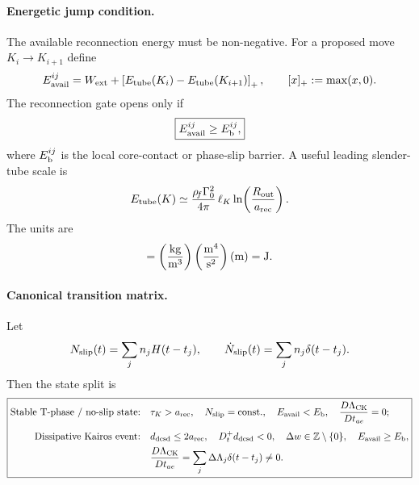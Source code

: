 \paragraph{Energetic jump condition.}
The available reconnection energy must be non-negative. For a proposed move $K_i\to K_{i+1}$ define
\begin{equation}
    E_{\rm avail}^{ij}
    =
    W_{\rm ext}
    +
    \left[ E_{\rm tube}(K_i)-E_{\rm tube}(K_{i+1})\right]_+,
    \qquad
    [x]_+:=\max(x,0).
    \label{eq:sst_positive_part_available_energy}
\end{equation}
The reconnection gate opens only if
\begin{equation}
    \boxed{
    E_{\rm avail}^{ij}\ge E_{\rm b}^{ij},
    }
    \label{eq:sst_reconnection_energy_gate}
\end{equation}
where $E_{\rm b}^{ij}$ is the local core-contact or phase-slip barrier. A useful leading slender-tube scale is
\begin{equation}
    E_{\rm tube}(K)
    \simeq
    \frac{\rho_{\!f}\Gamma_0^2}{4\pi}\,
    \ell_K
    \ln\!\left(\frac{R_{\rm out}}{a_{\rm rec}}\right).
    \label{eq:sst_slender_tube_energy_hitting}
\end{equation}
The units are
\begin{equation}
    [\rhoF\Gamma_0^2\ell_K]
    =
    \left(\frac{\rm kg}{{\rm m}^3}\right)
    \left(\frac{{\rm m}^4}{{\rm s}^2}\right)
    ({\rm m})
    =
    {\rm J}.
    \label{eq:sst_hitting_energy_units}
\end{equation}

\paragraph{Canonical transition matrix.}
Let
\begin{equation}
    N_{\rm slip}(t)
    =
    \sum_j n_jH(t-t_j),
    \qquad
    \dot N_{\rm slip}(t)
    =
    \sum_j n_j\delta(t-t_j).
    \label{eq:sst_phase_slip_counter}
\end{equation}
Then the state split is
\begin{equation}
\boxed{
\begin{aligned}
\text{Stable T-phase / no-slip state:}\quad
& \tau_K>a_{\rm rec},
\quad N_{\rm slip}={\rm const.},
\quad E_{\rm avail}<E_{\rm b},
\quad \frac{D\Lambda_{\rm CK}}{Dt_{ae}}=0;\\[0.4em]
\text{Dissipative Kairos event:}\quad
& d_{\rm dcsd}\le2a_{\rm rec},
\quad D_t^+d_{\rm dcsd}<0,
\quad \Delta w\in\mathbb Z\setminus\{0\},
\quad E_{\rm avail}\ge E_{\rm b},\\
& \frac{D\Lambda_{\rm CK}}{Dt_{ae}}
=\sum_j\Delta\Lambda_j\delta(t-t_j)\ne0.
\end{aligned}}
\label{eq:sst_canonical_transition_matrix_hitting}
\end{equation}

